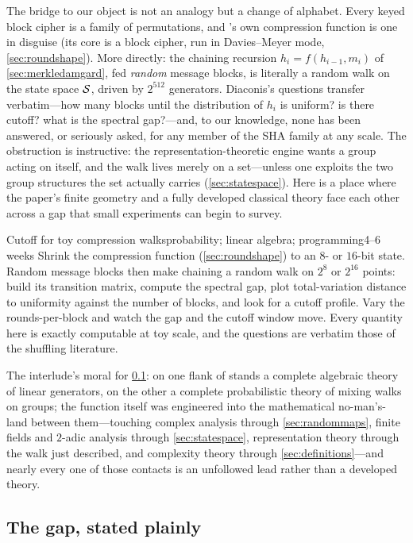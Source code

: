 The bridge to our object is not an analogy but a change of alphabet.
Every keyed block cipher is a family of permutations, and \SHA{}'s own
compression function is one in disguise (its core is a block cipher,
run in Davies--Meyer mode, \cref{sec:roundshape}). More directly: the
chaining recursion $h_i = f(h_{i-1}, m_i)$ of \cref{sec:merkledamgard},
fed \emph{random} message blocks, is literally a random walk on the
state space $\mathcal{S}$, driven by $2^{512}$ generators. Diaconis's
questions transfer verbatim---how many blocks until the distribution of
$h_i$ is uniform? is there cutoff? what is the spectral gap?---and, to
our knowledge, none has been answered, or seriously asked, for any
member of the SHA family at any scale. The obstruction is instructive:
the representation-theoretic engine wants a group acting on itself, and
the walk lives merely on a set---unless one exploits the two group
structures the set actually carries (\cref{sec:statespace}). Here is a
place where the paper's finite geometry and a fully developed classical
theory face each other across a gap that small experiments can begin to
survey.

\begin{project}{Cutoff for toy compression walks}{probability; linear
  algebra; programming}{4--6 weeks}
  Shrink the compression function (\cref{sec:roundshape}) to an $8$- or
  $16$-bit state. Random message blocks then make chaining a random
  walk on $2^{8}$ or $2^{16}$ points: build its transition matrix,
  compute the spectral gap, plot total-variation distance to uniformity
  against the number of blocks, and look for a cutoff profile. Vary the
  rounds-per-block and watch the gap and the cutoff window move. Every
  quantity here is exactly computable at toy scale, and the questions
  are verbatim those of the shuffling literature.
\end{project}

The interlude's moral for \cref{sec:gap}: on one flank of \SHA{} stands
a complete algebraic theory of linear generators, on the other a
complete probabilistic theory of mixing walks on groups; the function
itself was engineered into the mathematical no-man's-land between
them---touching complex analysis through \cref{sec:randommaps}, finite
fields and $2$-adic analysis through \cref{sec:statespace},
representation theory through the walk just described, and complexity
theory through \cref{sec:definitions}---and nearly every one of those
contacts is an unfollowed lead rather than a developed theory.

\subsection{The gap, stated plainly}\label{sec:gap}

